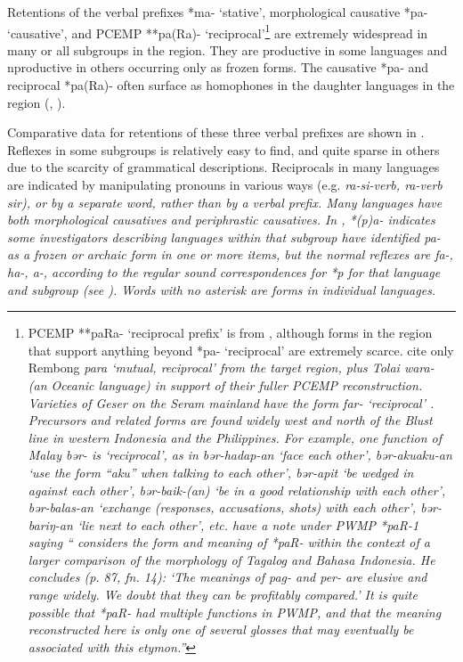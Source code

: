 Retentions of the verbal prefixes *ma- ‘stative’,
morphological causative *pa- ‘causative’,
and PCEMP **pa(Ra)- ‘reciprocal’\footnote{
		PCEMP **paRa- ‘reciprocal
		prefix’ is from \citet{BlustTrussel2020},
		although forms in the region that support anything beyond *pa-
		‘reciprocal’ are extremely scarce.
		\citet{BlustTrussel2020} cite only Rembong \it{para} ‘mutual,
		reciprocal’ from the target region,
		plus Tolai \it{wara-} (an Oceanic language) in support of their fuller PCEMP reconstruction.
		Varieties of Geser on the Seram mainland have the form \it{far-}
		‘reciprocal’ \citep{Loski-Grimes1990}.
		Precursors and related forms are found widely west
		and north of the Blust line in western Indonesia and the Philippines.
		For example, one function of Malay \it{bər-} is ‘reciprocal’,
		as in \it{bər-hadap-an} ‘face each other’,
		\it{bər-aku{\tl}aku-an} ‘use the form “\it{aku}” when talking
		to each other’, \it{bər-apit} ‘be wedged in against each other’,
		\it{bər-baik-(an)} ‘be in a good relationship with each other’,
		\it{bər-balas-an} ‘exchange (responses, accusations,
		shots) with each other’,
		\it{bər-bariŋ-an} ‘lie next to each other’, etc.
		\citet{BlustTrussel2020} have a note under PWMP *paR-1 saying
		“\citet{Wolff1981} considers the form
		and meaning of *paR- within the context of a larger comparison
		of the morphology of Tagalog and Bahasa Indonesia.
		He concludes (p. 87, fn. 14): ‘The meanings of \it{pag-}
		and \it{per-} are elusive and range widely.
		We doubt that they can be profitably compared.’ It is quite possible
		that *paR- had multiple functions in PWMP,
		and that the meaning reconstructed here is only one of several
		glosses that may eventually be associated with this etymon.”}
are extremely widespread in many or all subgroups in the region.
They are productive in some languages and
nproductive in others occurring only as frozen forms.
The causative *pa- and reciprocal *pa(Ra)- often surface as homophones
in the daughter languages in the region
(\citealp[113--115]{Grimes1991c}, \citealp{Grimes2008,GrimesRanohAplugi2008}).

Comparative data for retentions of these three verbal prefixes
are shown in .
Reflexes in some subgroups is relatively easy to find,
and quite sparse in others due to the scarcity of grammatical descriptions.
Reciprocals in many languages are indicated by manipulating 
pronouns in various ways (e.g.
\it{ra-si}-verb, \it{ra}-verb \it{sir}), or by a separate word,
rather than by a verbal prefix.
Many languages have both morphological causatives and periphrastic causatives.
In , *(p)a- indicates some investigators describing
languages within that subgroup have identified \it{pa-} as a
frozen or archaic form in one or more items,
but the normal reflexes are \it{fa-,
ha-, a-}, according to the regular sound correspondences for
*p for that language
and subgroup (see ).
Words with no asterisk are forms in individual languages.

